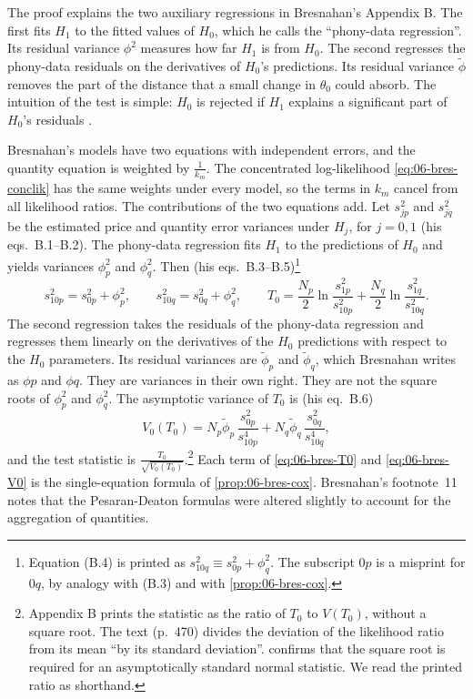 The proof explains the two auxiliary regressions in Bresnahan's Appendix B. The first fits $H_1$ to the fitted
values of $H_0$, which he calls the ``phony-data regression''. Its residual variance $\phi^2$ measures how far $H_1$
is from $H_0$. The second regresses the phony-data residuals on the derivatives of $H_0$'s predictions. Its
residual variance $\tilde\phi$ removes the part of the distance that a small change in $\theta_0$ could absorb.
The intuition of the test is simple: $H_0$ is rejected if $H_1$ explains a significant part of $H_0$'s
residuals \citep[p.~471]{Bresnahan1987}.

Bresnahan's models have two equations with independent errors, and the quantity equation is weighted by
$\frac{1}{k_m}$. The concentrated log-likelihood \eqref{eq:06-bres-conclik} has the same weights under every model,
so the terms in $k_m$ cancel from all likelihood ratios. The contributions of the two equations add. Let $s^2_{jp}$
and $s^2_{jq}$ be the estimated price and quantity error variances under $H_j$, for $j = 0, 1$ (his eqs.~B.1--B.2).
The phony-data regression fits $H_1$ to the predictions of $H_0$ and yields variances $\phi^2_p$ and $\phi^2_q$. Then
(his eqs.~B.3--B.5)\footnote{Equation (B.4) is printed as $s^2_{10q} \equiv s^2_{0p} + \phi^2_q$. The subscript $0p$ is
a misprint for $0q$, by analogy with (B.3) and with \cref{prop:06-bres-cox}.}
\begin{equation}\label{eq:06-bres-T0}
  s^2_{10p} = s^2_{0p} + \phi^2_p,
  \qquad
  s^2_{10q} = s^2_{0q} + \phi^2_q,
  \qquad
  T_0 = \frac{N_p}{2}\ln\frac{s^2_{1p}}{s^2_{10p}} + \frac{N_q}{2}\ln\frac{s^2_{1q}}{s^2_{10q}} .
\end{equation}
The second regression takes the residuals of the phony-data regression and regresses them linearly on the
derivatives of the $H_0$ predictions with respect to the $H_0$ parameters. Its residual variances are
$\tilde\phi_p$ and $\tilde\phi_q$, which Bresnahan writes as $\phi p$ and $\phi q$. They are variances in their own
right. They are not the square roots of $\phi^2_p$ and $\phi^2_q$. The asymptotic variance of $T_0$ is (his eq.~B.6)
\begin{equation}\label{eq:06-bres-V0}
  V_0(T_0) = N_p\tilde\phi_p\,\frac{s^2_{0p}}{s^4_{10p}} + N_q\tilde\phi_q\,\frac{s^2_{0q}}{s^4_{10q}},
\end{equation}
and the test statistic is $\frac{T_0}{\sqrt{V_0(T_0)}}$.\footnote{Appendix B prints the statistic as the ratio of $T_0$ to $V(T_0)$, without a square root. The text
(p.~470) divides the deviation of the likelihood ratio from its mean ``by its standard deviation''.
 confirms that the square root is required for an asymptotically standard normal statistic. We
read the printed ratio as shorthand.} Each term of \eqref{eq:06-bres-T0} and \eqref{eq:06-bres-V0} is the
single-equation formula of \cref{prop:06-bres-cox}. Bresnahan's footnote~11 notes that the Pesaran-Deaton formulas were
altered slightly to account for the aggregation of quantities.

